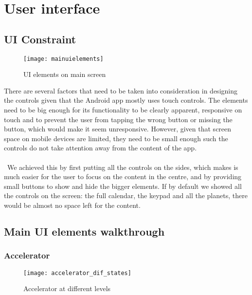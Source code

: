 \section{User interface}
\label{uilolol}


\subsection{UI Constraint}


\begin{figure}[!htbp]
  \begin{center}
    \leavevmode
    \ifpdf
      \texttt{[image: mainuielements]}
    \fi
    \caption{UI elements on main screen}
    \label{UI elements on main screen}
  \end{center}
\end{figure}

There are several factors that need to be taken into consideration in designing the controls given that the Android app mostly uses touch controls. The elements need to be big enough for its functionality to be clearly apparent, responsive on touch and to prevent the user from tapping the wrong button or missing the button, which would make it seem unresponsive. However, given that screen space on mobile devices are limited, they need to be small enough such the controls do not take attention away from the content of the app. 
\\\\\
We achieved this by first putting all the controls on the sides, which makes is much easier for the user to focus on the content in the centre, and by providing small buttons to show and hide the bigger elements. If by default we showed all the controls on the screen: the full calendar, the keypad and all the planets, there would be almost no space left for the content.


\subsection{Main UI elements walkthrough}


\subsubsection{Accelerator}

\begin{figure}[!htbp]
  \begin{center}
    \leavevmode
    \ifpdf
      \texttt{[image: accelerator\_dif\_states]}
    \fi
    \caption{Accelerator at different levels}
    \label{Accelerator at different levels}
  \end{center}
\end{figure}

